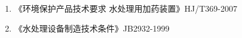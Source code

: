 

\begin{enumerate}
  \item 《环境保护产品技术要求 水处理用加药装置》HJ/T369-2007
  \item 《水处理设备制造技术条件》JB2932-1999
\end{enumerate}

